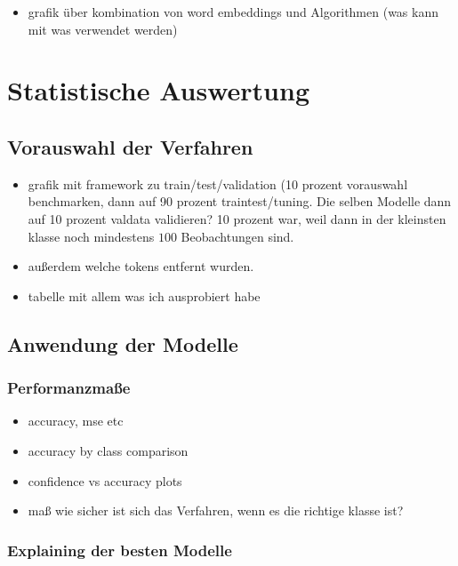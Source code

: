 \documentclass[a4paper,11pt]{article}
\begin{document}
\begin{itemize}
    \item grafik über kombination von word embeddings und Algorithmen (was kann mit was verwendet werden)
\end{itemize}{}


\section{Statistische Auswertung}\label{Kap:statAus}

\subsection{Vorauswahl der Verfahren}

\begin{itemize}
    \item grafik mit framework zu train/test/validation (10 prozent vorauswahl benchmarken, dann auf 90 prozent traintest/tuning. Die selben Modelle dann auf 10 prozent valdata validieren? 10 prozent war, weil dann in der kleinsten klasse noch mindestens $100$ Beobachtungen sind.
    \item außerdem welche tokens entfernt wurden.
    \item tabelle mit allem was ich ausprobiert habe
\end{itemize}{}

\subsection{Anwendung der Modelle}
\subsubsection{Performanzmaße}

\begin{itemize}
    \item accuracy, mse etc
    \item accuracy by class comparison
    \item confidence vs accuracy plots
    \item maß wie sicher ist sich das Verfahren, wenn es die richtige klasse ist?
\end{itemize}{}

\subsubsection{Explaining der besten Modelle}
\end{document}
